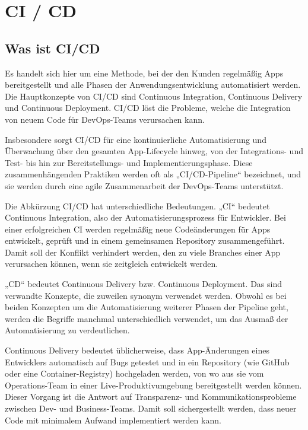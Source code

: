 \chapter{CI / CD}
\section{Was ist CI/CD}

Es handelt sich hier um eine Methode, bei der den Kunden regelmäßig Apps bereitgestellt und alle Phasen der Anwendungsentwicklung automatisiert werden. Die Hauptkonzepte von CI/CD sind Continuous Integration, Continuous Delivery und Continuous Deployment. CI/CD löst die Probleme, welche die Integration von neuem Code für DevOps-Teams verursachen kann.\cite{whatIsCICD}

Insbesondere sorgt CI/CD für eine kontinuierliche Automatisierung und Überwachung über den gesamten App-Lifecycle hinweg, von der Integrations- und Test- bis hin zur Bereitstellungs- und Implementierungsphase. Diese zusammenhängenden Praktiken werden oft als „CI/CD-Pipeline“ bezeichnet, und sie werden durch eine agile Zusammenarbeit der DevOps-Teams unterstützt.\autocite{whatIsCICD}

Die Abkürzung CI/CD hat unterschiedliche Bedeutungen. „CI“ bedeutet Continuous Integration, also der Automatisierungsprozess für Entwickler. Bei einer erfolgreichen CI werden regelmäßig neue Codeänderungen für Apps entwickelt, geprüft und in einem gemeinsamen Repository zusammengeführt. Damit soll der Konflikt verhindert werden, den zu viele Branches einer App verursachen können, wenn sie zeitgleich entwickelt werden.\autocite{whatIsCICD}

„CD“ bedeutet Continuous Delivery bzw. Continuous Deployment. Das sind verwandte Konzepte, die zuweilen synonym verwendet werden. Obwohl es bei beiden Konzepten um die Automatisierung weiterer Phasen der Pipeline geht, werden die Begriffe manchmal unterschiedlich verwendet, um das Ausmaß der Automatisierung zu verdeutlichen.\autocite{whatIsCICD}

Continuous Delivery bedeutet üblicherweise, dass App-Änderungen eines Entwicklers automatisch auf Bugs getestet und in ein Repository (wie GitHub oder eine Container-Registry) hochgeladen werden, von wo aus sie vom Operations-Team in einer Live-Produktivumgebung bereitgestellt werden können. Dieser Vorgang ist die Antwort auf Transparenz- und Kommunikationsprobleme zwischen Dev- und Business-Teams. Damit soll sichergestellt werden, dass neuer Code mit minimalem Aufwand implementiert werden kann.\autocite{whatIsCICD}

